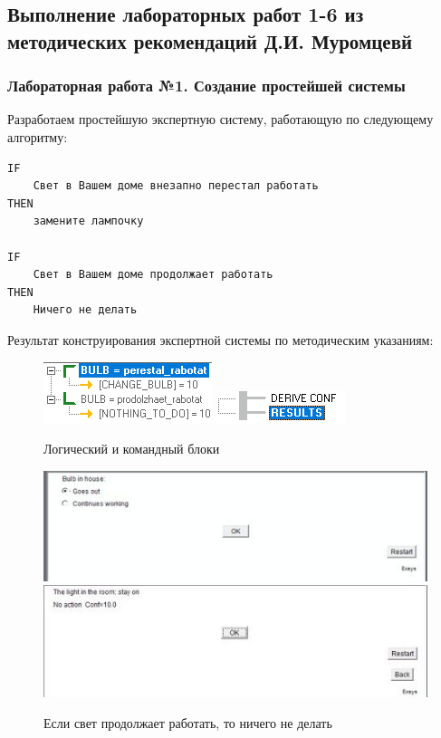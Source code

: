 \documentclass[14pt,a4paper,report]{report}
\begin{document}
\subsection{Выполнение лабораторных работ 1-6 из методических рекомендаций Д.И. Муромцевй}

\subsubsection{Лабораторная работа №1. Создание простейшей системы}

Разработаем простейшую экспертную систему, работающую по следующему алгоритму:

\begin{lstlisting}
IF
    Свет в Вашем доме внезапно перестал работать
THEN
    замените лампочку

IF
    Свет в Вашем доме продолжает работать
THEN
    Ничего не делать
\end{lstlisting}

Результат конструирования экспертной системы по методическим указаниям:

\begin{figure}[ht!]
	\includegraphics[width=.35\textwidth]{images/1_1.png}\hfill
	\includegraphics[width=.55\textwidth]{images/1_2.png}
	\caption{Логический и командный блоки}
\end{figure}

\begin{figure}[ht!]
	\includegraphics[width=.50\textwidth]{images/1_3.png}\hfill
	\includegraphics[width=.50\textwidth]{images/1_5.jpg}
	\caption{Если свет продолжает работать, то ничего не делать}
\end{figure}
\end{document}
